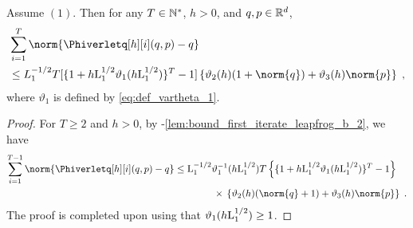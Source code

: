 \begin{lemma}
  \label{lem:bounded_cum_error}
  Assume $(1)$. Then for any $T \in \mathbb{N}^{*}$, $h >0$, and $q,p \in \mathbb{R}^d$,
  \begin{align}
    &\sum_{i=1}^{T}  \norm{ \Phiverletq[h][i](\q,p) -q} \\
    &\leq  L^{-1/2}_1 T [\{1 + h  \constzero^{1/2} \vartheta_1(h\constzero^{1/2})\}^T  -1] \defEns{\vartheta_2(h) (1+\norm{q})  + \vartheta_3(h) \norm{p}} \eqsp,
  \end{align}
where  $\vartheta_1$ is defined by  \eqref{eq:def_vartheta_1}.
\end{lemma}
\begin{proof}
For  $T \geq 2$ and $h >0$,  by  -\ref{lem:bound_first_iterate_leapfrog_b_2},   we have
\begin{align}
\sum_{i=1}^{T-1}  \norm{ \Phiverletq[h][i](\q,p) -q}
&\leq 
 \constzero^{-1/2} \vartheta_1^{-1}(h \constzero^{1/2}) T \defEns{\{1+h \constzero^{1/2}\vartheta_1(h\constzero^{1/2})\}^{T}-1} \\
 & \qquad \qquad \times \, \defEns{\vartheta_2(h) (\norm{q} +1) + \vartheta_3(h) \norm{p}} \eqsp.
\end{align}
The proof is completed upon using that $\vartheta_1(h \mathrm{L}_1^{1/2}) \geq 1$.
\end{proof}



